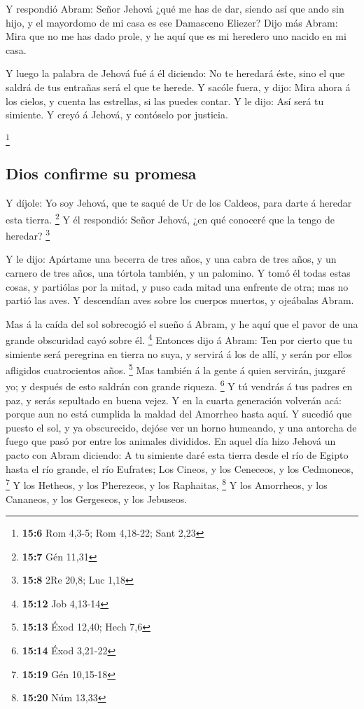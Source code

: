  Y respondió Abram: Señor Jehová ¿qué me has de dar, siendo
así que ando sin hijo, y el mayordomo de mi casa es ese Damasceno
Eliezer?  Dijo más Abram: Mira que no me has dado prole, y
he aquí que es mi heredero uno nacido en mi casa.

 Y luego la palabra de Jehová fué á él diciendo: No te
heredará éste, sino el que saldrá de tus entrañas será el que te herede.
 Y sacóle fuera, y dijo: Mira ahora á los cielos, y cuenta
las estrellas, si las puedes contar. Y le dijo: Así será tu simiente.
 Y creyó á Jehová, y contóselo por justicia.

\footnote{\textbf{15:6} Rom 4,3-5; Rom 4,18-22; Sant 2,23}

\hypertarget{dios-confirme-su-promesa}{%
\subsection{Dios confirme su promesa}\label{dios-confirme-su-promesa}}

 Y díjole: Yo soy Jehová, que te saqué de Ur de los Caldeos,
para darte á heredar esta tierra. \footnote{\textbf{15:7} Gén 11,31}
 Y él respondió: Señor Jehová, ¿en qué conoceré que la tengo
de heredar? \footnote{\textbf{15:8} 2Re 20,8; Luc 1,18}

 Y le dijo: Apártame una becerra de tres años, y una cabra
de tres años, y un carnero de tres años, una tórtola también, y un
palomino.  Y tomó él todas estas cosas, y partiólas por la
mitad, y puso cada mitad una enfrente de otra; mas no partió las aves.
 Y descendían aves sobre los cuerpos muertos, y ojeábalas
Abram.

 Mas á la caída del sol sobrecogió el sueño á Abram, y he
aquí que el pavor de una grande obscuridad cayó sobre él. \footnote{\textbf{15:12}
  Job 4,13-14}  Entonces dijo á Abram: Ten por cierto que
tu simiente será peregrina en tierra no suya, y servirá á los de allí, y
serán por ellos afligidos cuatrocientos años. \footnote{\textbf{15:13}
  Éxod 12,40; Hech 7,6}  Mas también á la gente á quien
servirán, juzgaré yo; y después de esto saldrán con grande riqueza.
\footnote{\textbf{15:14} Éxod 3,21-22}  Y tú vendrás á tus
padres en paz, y serás sepultado en buena vejez.  Y en la
cuarta generación volverán acá: porque aun no está cumplida la maldad
del Amorrheo hasta aquí.  Y sucedió que puesto el sol, y ya
obscurecido, dejóse ver un horno humeando, y una antorcha de fuego que
pasó por entre los animales divididos.  En aquel día hizo
Jehová un pacto con Abram diciendo: A tu simiente daré esta tierra desde
el río de Egipto hasta el río grande, el río Eufrates;  Los
Cineos, y los Ceneceos, y los Cedmoneos, \footnote{\textbf{15:19} Gén
  10,15-18}  Y los Hetheos, y los Pherezeos, y los
Raphaitas, \footnote{\textbf{15:20} Núm 13,33}  Y los
Amorrheos, y los Cananeos, y los Gergeseos, y los Jebuseos.

